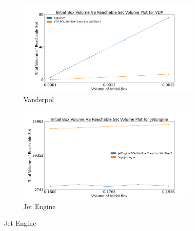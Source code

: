 \begin{figure}[h!]
    \hspace{-1.5em}
    \begin{subfigure}{0.5\textwidth}
    \centering
    \includegraphics[width=1.1\textwidth, height=0.75\textwidth]{figures/InitVolVSReachVol/VDPInitReachVol.png}
    \caption{Vanderpol}
    \end{subfigure}%
    \begin{subfigure}{0.5\textwidth}
    \centering
    \includegraphics[width=1.1\textwidth, height=0.75\textwidth]{figures/InitVolVSReachVol/JetEngineInitReachVol.png}
    \caption{Jet Engine}
    \end{subfigure}


\end{figure}
